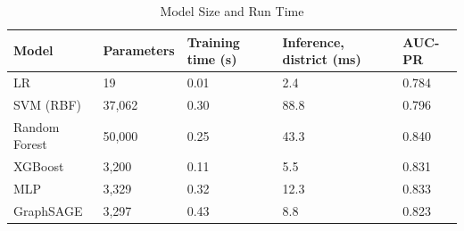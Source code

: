 \begin{table}
\caption{Model Size and Run Time}
\label{tab:efficiency}
\begin{tabular}{lllll}
\toprule
Model & Parameters & Training time (s) & Inference, district (ms) & AUC-PR \\
\midrule
LR & 19 & 0.01 & 2.4 & 0.784 \\
SVM (RBF) & 37,062 & 0.30 & 88.8 & 0.796 \\
Random Forest & 50,000 & 0.25 & 43.3 & 0.840 \\
XGBoost & 3,200 & 0.11 & 5.5 & 0.831 \\
MLP & 3,329 & 0.32 & 12.3 & 0.833 \\
GraphSAGE & 3,297 & 0.43 & 8.8 & 0.823 \\
\bottomrule
\end{tabular}
\end{table}
